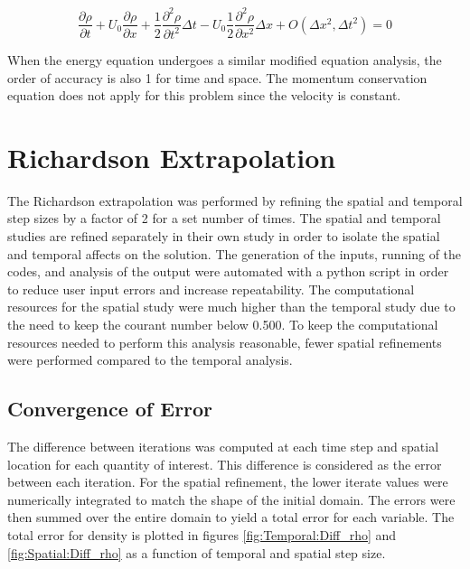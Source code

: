 \documentclass{mc2015}
\begin{document}
    \begin{equation}
    	\label{eq:MEA_p1}
    	 \frac{\partial \rho}{\partial t}  +  U_{0} \frac{\partial \rho}{\partial x} + 
    	 \frac{1}{2} \frac{\partial^2 \rho}{\partial t^2} \Delta t -
    	   U_{0}  \frac{1}{2} \frac{\partial^2 \rho}{\partial x^2} \Delta x  
    	   + O(\Delta x^{2},\Delta t^{2}) = 0 
    \end{equation} 
    
    When the energy equation undergoes a similar modified equation analysis, the
    order of accuracy is also 1 for time and space. The momentum conservation
    equation does not apply for this problem since the velocity is
    constant.
    

\section{Richardson Extrapolation}

The Richardson extrapolation was performed by refining the spatial and temporal
step sizes by a factor of 2 for a set number of times. The spatial and temporal
studies are refined separately in their own study in order to isolate the
spatial and temporal affects on the solution. The generation of the inputs,
running of the codes, and analysis of the output were automated with a python
script in order to reduce user input errors and increase repeatability. The
computational resources for the spatial study were much higher than the temporal
study due to the need to keep the courant number below 0.500. To keep the
computational resources needed to perform this analysis reasonable, fewer
spatial refinements were performed compared to the temporal analysis.

\subsection{Convergence of Error}

The difference between iterations was computed at each time step and spatial
location for each quantity of interest. This difference is considered as the
error between each iteration. For the spatial refinement, the lower iterate
values were numerically integrated to match the shape of the initial domain. The
errors were then summed over the entire domain to yield a total error for each
variable. The total error for density is plotted in figures
\ref{fig:Temporal:Diff_rho} and \ref{fig:Spatial:Diff_rho} as a function of
temporal and spatial step size.
\end{document}
